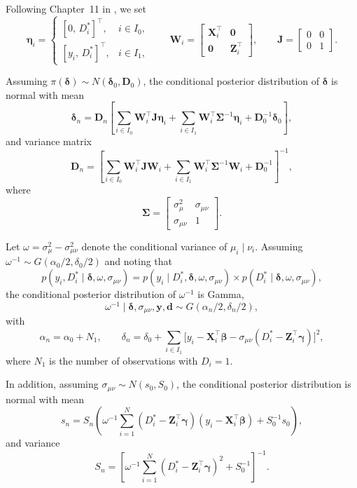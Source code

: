 Following Chapter~11 in \cite{greenberg2012introduction}, we set
\[
\boldsymbol{\eta}_i=
\begin{cases}
	[0, \, D_i^*]^{\top}, & i\in I_0,\\
	[y_i, \, D_i^*]^{\top}, & i\in I_1,
\end{cases}
\qquad
\mathbf{W}_i=\begin{bmatrix}
	\mathbf{X}_i^{\top} & \mathbf{0}\\
	\mathbf{0} & \mathbf{Z}_i^{\top}
\end{bmatrix}, 
\qquad
\mathbf{J}=\begin{bmatrix}
	0 & 0\\
	0 & 1
\end{bmatrix}.
\]

Assuming $\pi(\boldsymbol{\delta}) \sim N(\boldsymbol{\delta}_0,\mathbf{D}_0)$, the conditional posterior distribution of $\boldsymbol{\delta}$ is normal with mean
\[
\boldsymbol{\delta}_n=\mathbf{D}_n\left[\sum_{i\in I_0}\mathbf{W}_i^{\top}\mathbf{J}\boldsymbol{\eta}_i
+\sum_{i\in I_1}\mathbf{W}_i^{\top}\boldsymbol{\Sigma}^{-1}\boldsymbol{\eta}_i
+\mathbf{D}_0^{-1}\boldsymbol{\delta}_0\right],
\]
and variance matrix
\[
\mathbf{D}_n=\left[\sum_{i\in I_0}\mathbf{W}_i^{\top}\mathbf{J}\mathbf{W}_i
+\sum_{i\in I_1}\mathbf{W}_i^{\top}\boldsymbol{\Sigma}^{-1}\mathbf{W}_i
+\mathbf{D}_0^{-1}\right]^{-1},
\] 
where 
\[
\boldsymbol{\Sigma}=\begin{bmatrix}
	\sigma^2_{\mu} & \sigma_{\mu\nu} \\[6pt]
	\sigma_{\mu\nu} & 1
\end{bmatrix}.
\]

Let $\omega=\sigma^2_{\mu}-\sigma^2_{\mu\nu}$ denote the conditional variance of $\mu_i \mid \nu_i$. 
Assuming $\omega^{-1}\sim G(\alpha_0/2,\delta_0/2)$ and noting that
\[
p(y_i,D_i^*\mid \boldsymbol{\delta},\omega,\sigma_{\mu\nu})
= p(y_i\mid D_i^*, \boldsymbol{\delta},\omega,\sigma_{\mu\nu})
\times p(D_i^*\mid \boldsymbol{\delta},\omega,\sigma_{\mu\nu}),
\]
the conditional posterior distribution of $\omega^{-1}$ is Gamma,
\[
\omega^{-1}\mid \boldsymbol{\delta},\sigma_{\mu\nu}, \mathbf{y},\mathbf{d} \sim G(\alpha_n/2,\delta_n/2),
\]
with
\[
\alpha_n=\alpha_0+N_1,
\qquad
\delta_n=\delta_0+\sum_{i\in I_1}\Big[y_i-\mathbf{X}_i^{\top}\boldsymbol{\beta}
-\sigma_{\mu\nu}(D_i^*-\mathbf{Z}_i^{\top}\boldsymbol{\gamma})\Big]^2,
\]
where $N_1$ is the number of observations with $D_i=1$.

In addition, assuming $\sigma_{\mu\nu}\sim N(s_0,S_0)$, the conditional posterior distribution is normal with mean
\[
s_n=S_n\left(\omega^{-1}\sum_{i=1}^N(D_i^*-\mathbf{Z}_i^{\top}\boldsymbol{\gamma})(y_i-\mathbf{X}_i^{\top}\boldsymbol{\beta})
+S_0^{-1}s_0\right),
\]
and variance
\[
S_n=\left[\omega^{-1}\sum_{i=1}^N(D_i^*-\mathbf{Z}_i^{\top}\boldsymbol{\gamma})^2+S_0^{-1}\right]^{-1}.
\]

